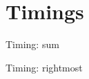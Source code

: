 \section{Timings}



\begin{frame}{Timing: sum}
\end{frame}

\begin{frame}{Timing: rightmost}
\end{frame}
